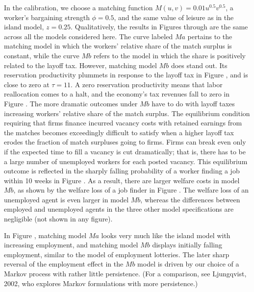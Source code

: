 In the calibration, we choose a matching function $M(u,v)=0.01 u^{0.5}
v^{0.5}$, a worker's bargaining strength $\phi=0.5$, and the same value
of leisure as in the island model, $z=0.25$. Qualitatively, the results
in Figures  through   %
are the same across all the models
considered here. The curve labeled $Ma$ pertains to the matching model
in which the workers' relative share of the match surplus is constant,
while the curve $Mb$ refers to the model in which the share is positively
related to the layoff tax. However, matching model $Mb$ does stand
out. Its reservation productivity plummets in
response to the layoff tax in Figure ,  %
and is close to zero
at $\tau=11$. A zero reservation productivity means that labor
reallocation comes to a halt, and the economy's tax revenues
fall to zero in Figure .   %
The more dramatic outcomes under $Mb$
have to do with layoff taxes increasing workers' relative
share of the match surplus.
The equilibrium condition
 requiring that firms finance incurred vacancy
costs with retained earnings from the matches becomes exceedingly
difficult to satisfy when a higher layoff tax erodes the fraction
of match surpluses going to firms.
Firms can  break even only if the expected time to fill a vacancy
is cut dramatically; that is, there has to be a large number of
unemployed workers for each posted vacancy. This equilibrium outcome
is reflected in the sharply falling probability of a worker
finding a job within 10 weeks in Figure .     %
As a result, there
are larger welfare costs in model $Mb$, as shown by the welfare
loss of a job finder in Figure .   %
The welfare loss of
an unemployed agent is even larger in model $Mb$, whereas the
differences between employed and unemployed agents in the three other
model specifications are negligible (not shown in any figure).

In Figure ,   %
matching model $Ma$ looks very much like
the island model with increasing employment, and matching model
$Mb$ displays initially falling employment, similar to the model of
employment lotteries. The later sharp reversal of the employment
effect in the $Mb$ model is driven by our choice of a Markov
process with rather little persistence. (For a comparison, see
Ljungqvist, 2002, who explores Markov formulations with more
persistence.)

